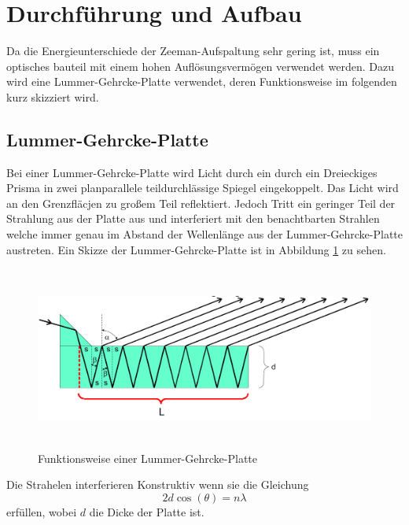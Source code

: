 \section{Durchführung und Aufbau}
\label{sec:Durchführung}

Da die Energieunterschiede der Zeeman-Aufspaltung sehr gering ist, muss ein optisches bauteil mit einem hohen Auflösungsvermögen verwendet werden. Dazu wird eine Lummer-Gehrcke-Platte verwendet, deren Funktionsweise im folgenden kurz skizziert wird. 
\subsection{Lummer-Gehrcke-Platte}
Bei einer Lummer-Gehrcke-Platte wird Licht durch ein durch ein Dreieckiges Prisma in zwei planparallele teildurchlässige Spiegel eingekoppelt. Das Licht wird an den Grenzfläcjen zu großem Teil reflektiert. Jedoch Tritt ein geringer Teil der Strahlung aus der Platte aus und interferiert mit den benachtbarten Strahlen welche immer genau im Abstand der Wellenlänge aus der Lummer-Gehrcke-Platte austreten. Ein Skizze der Lummer-Gehrcke-Platte ist in Abbildung \ref{fig:Lum} zu sehen.

\begin{figure}[H]
  \centering
  \includegraphics[height=6cm]{Bilder/Lummer.png}
  \caption{Funktionsweise einer Lummer-Gehrcke-Platte}
  \label{fig:Lum}
\end{figure}

Die Strahelen interferieren Konstruktiv wenn sie die Gleichung 
\begin{equation}
  2 d \cos(\theta) = n \lambda
  \label{}
\end{equation}
erfüllen, wobei $d$ die Dicke der Platte ist.

